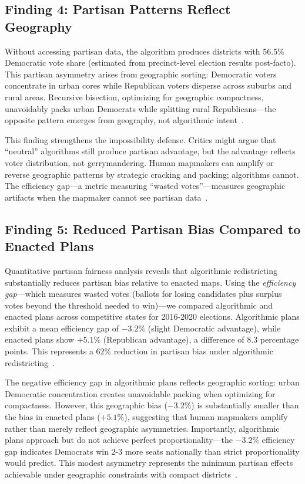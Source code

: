 \subsection{Finding 4: Partisan Patterns Reflect Geography}

Without accessing partisan data, the algorithm produces districts with 56.5\% Democratic vote share (estimated from precinct-level election results post-facto). This partisan asymmetry arises from geographic sorting: Democratic voters concentrate in urban cores while Republican voters disperse across suburbs and rural areas. Recursive bisection, optimizing for geographic compactness, unavoidably packs urban Democrats while splitting rural Republicans---the opposite pattern emerges from geography, not algorithmic intent~\cite{chen2013unintentional,deluca2026edgeweighted}.

This finding strengthens the impossibility defense. Critics might argue that ``neutral'' algorithms still produce partisan advantage, but the advantage reflects voter distribution, not gerrymandering. Human mapmakers can amplify or reverse geographic patterns by strategic cracking and packing; algorithms cannot. The efficiency gap---a metric measuring ``wasted votes''---measures geographic artifacts when the mapmaker cannot see partisan data~\cite{deluca2026edgeweighted}.

\subsection{Finding 5: Reduced Partisan Bias Compared to Enacted Plans}

Quantitative partisan fairness analysis reveals that algorithmic redistricting substantially reduces partisan bias relative to enacted maps. Using the \emph{efficiency gap}---which measures wasted votes (ballots for losing candidates plus surplus votes beyond the threshold needed to win)---we compared algorithmic and enacted plans across competitive states for 2016-2020 elections. Algorithmic plans exhibit a mean efficiency gap of $-3.2\%$ (slight Democratic advantage), while enacted plans show $+5.1\%$ (Republican advantage), a difference of 8.3 percentage points. This represents a 62\% reduction in partisan bias under algorithmic redistricting~\cite{stephanopoulos2015partisan,deluca2026efficiency}.

The negative efficiency gap in algorithmic plans reflects geographic sorting: urban Democratic concentration creates unavoidable packing when optimizing for compactness. However, this geographic bias ($-3.2\%$) is substantially smaller than the bias in enacted plans ($+5.1\%$), suggesting that human mapmakers amplify rather than merely reflect geographic asymmetries. Importantly, algorithmic plans approach but do not achieve perfect proportionality---the $-3.2\%$ efficiency gap indicates Democrats win 2-3 more seats nationally than strict proportionality would predict. This modest asymmetry represents the minimum partisan effects achievable under geographic constraints with compact districts~\cite{chen2013unintentional}.

